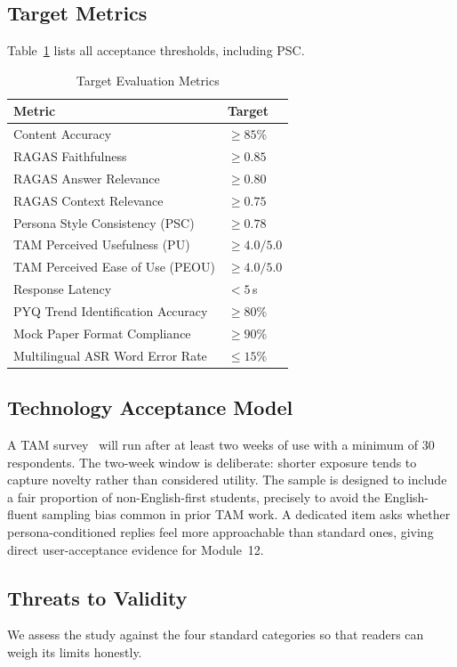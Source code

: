 \documentclass[conference]{IEEEtran}
\begin{document}
\subsection{Target Metrics}
Table~\ref{tab:metrics} lists all acceptance thresholds, including PSC.
\begin{table}[htbp]
\caption{Target Evaluation Metrics}
\label{tab:metrics}
\begin{tabular}{ll}
\toprule
\textbf{Metric}                      & \textbf{Target} \\
\midrule
Content Accuracy                     & $\geq 85\%$ \\
RAGAS Faithfulness                   & $\geq 0.85$ \\
RAGAS Answer Relevance               & $\geq 0.80$ \\
RAGAS Context Relevance              & $\geq 0.75$ \\
Persona Style Consistency (PSC)      & $\geq 0.78$ \\
TAM Perceived Usefulness (PU)        & $\geq 4.0/5.0$ \\
TAM Perceived Ease of Use (PEOU)     & $\geq 4.0/5.0$ \\
Response Latency                     & $< 5\,$s \\
PYQ Trend Identification Accuracy    & $\geq 80\%$ \\
Mock Paper Format Compliance         & $\geq 90\%$ \\
Multilingual ASR Word Error Rate     & $\leq 15\%$ \\
\bottomrule
\end{tabular}
\end{table}
\subsection{Technology Acceptance Model}
A TAM survey~\cite{davis1989} will run after at least two weeks of use
with a minimum of 30 respondents. The two-week window is deliberate:
shorter exposure tends to capture novelty rather than considered
utility. The sample is designed to include a fair proportion of
non-English-first students, precisely to avoid the English-fluent
sampling bias common in prior TAM work. A dedicated item asks whether
persona-conditioned replies feel more approachable than standard ones,
giving direct user-acceptance evidence for Module~12.

\subsection{Threats to Validity}
We assess the study against the four standard categories so that
readers can weigh its limits honestly.
\end{document}
